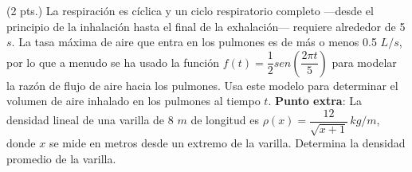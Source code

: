 \documentclass[12pt]{exam}
\begin{document}
\begin{questions}
\vskip10pt

 \question  (2 pts.) La respiración es cíclica y un ciclo respiratorio completo —desde el principio de la inhalación hasta el final de la exhalación— requiere alrededor de 5 $s$. La tasa máxima de aire que entra en los pulmones es de más o menos 0.5 $L/s$, por lo que a menudo se ha usado la función $f(t)=\dfrac{1}{2}sen\left(\dfrac{2\pi t}{5}\right)$ para modelar la razón de flujo de aire hacia los pulmones. Usa este modelo para determinar el volumen de aire inhalado en los pulmones al tiempo $t$.
\vskip10pt
\textbf{Punto extra}: La densidad lineal de una varilla de 8 $m$ de longitud es $\rho(x)=\dfrac{12}{\sqrt{x+1}} \, kg/m$, donde $x$ se mide en metros desde un extremo de la varilla. Determina la densidad promedio de la varilla. 



    
        \end{questions}
        \vskip30pt
 \RaggedRight
     
    \newpage



\pagestyle{foot}    %
\end{document}
